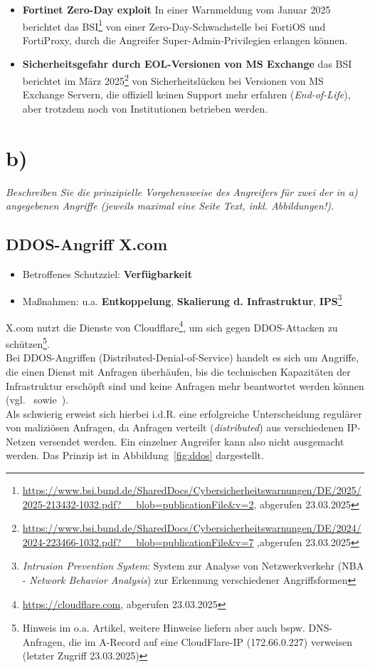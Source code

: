 \begin{itemize}
    \item \textbf{Fortinet Zero-Day exploit} In einer Warnmeldung vom Januar 2025 berichtet das BSI\footnote{
        \url{https://www.bsi.bund.de/SharedDocs/Cybersicherheitswarnungen/DE/2025/2025-213432-1032.pdf?__blob=publicationFile&v=2}, abgerufen 23.03.2025
    } von einer Zero-Day-Schwachstelle bei FortiOS und FortiProxy, durch die Angreifer Super-Admin-Privilegien erlangen können.
    \item \textbf{Sicherheitsgefahr durch EOL-Versionen von MS Exchange} das BSI berichtet im März 2025\footnote{
    \url{https://www.bsi.bund.de/SharedDocs/Cybersicherheitswarnungen/DE/2024/2024-223466-1032.pdf?__blob=publicationFile&v=7} ,abgerufen 23.03.2025
    } von Sicherheitslücken bei Versionen von MS Exchange Servern, die offiziell keinen Support mehr erfahren (\textit{End-of-Life}), aber trotzdem noch von Institutionen betrieben werden.
\end{itemize}

\section{b)}
\textit{Beschreiben Sie die prinzipielle Vorgehensweise des Angreifers für zwei der in a) angegebenen Angriffe (jeweils maximal eine Seite Text, inkl. Abbildungen!).}


\subsection*{DDOS-Angriff X.com}

\begin{itemize}
    \item Betroffenes Schutzziel: \textbf{Verfügbarkeit}
    \item Maßnahmen: u.a. \textbf{Entkoppelung}, \textbf{Skalierung d. Infrastruktur}, \textbf{IPS}\footnote{
    \textit{Intrusion Prevention System}: System zur Analyse von Netzwerkverkehr (NBA - \textit{Network Behavior Analysis}) zur Erkennung verschiedener Angriffsformen
    }
\end{itemize}
\noindent
X.com nutzt die Dienste von Cloudflare\footnote{
\url{https://cloudflare.com}, abgerufen 23.03.2025
}, um sich gegen DDOS-Attacken zu schützen\footnote{
Hinweis im o.a. Artikel, weitere Hinweise liefern aber auch bspw. DNS-Anfragen, die im A-Record auf eine CloudFlare-IP (172.66.0.227) verweisen (letzter Zugriff 23.03.2025)
}.\\
Bei DDOS-Angriffen (Distributed-Denial-of-Service) handelt es sich um Angriffe, die einen Dienst mit Anfragen überhäufen, bis die technischen Kapazitäten der Infrastruktur erschöpft sind und keine Anfragen mehr beantwortet werden können (vgl.~\cite[120 ff.]{Eck18} sowie~\cite[533 ff.]{SL05}).\\
Als schwierig erweist sich hierbei i.d.R. eine erfolgreiche Unterscheidung regulärer von maliziösen Anfragen, da Anfragen verteilt (\textit{distributed}) aus verschiedenen IP-Netzen versendet werden.
Ein einzelner Angreifer kann also nicht ausgemacht werden.
Das Prinzip ist in Abbildung~\ref{fig:ddos} dargestellt.\\


